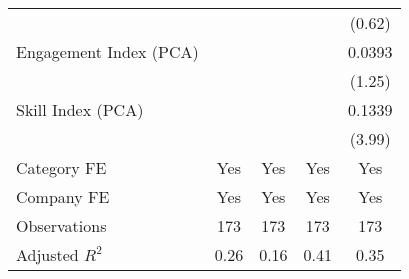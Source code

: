 {\begin{tabular}{l*{4}{c}}
                                   &                   &                   &                   &    (0.62)         \\
[1em]
Engagement Index (PCA)             &                   &                   &                   &    0.0393         \\
                                   &                   &                   &                   &    (1.25)         \\
[1em]
Skill Index (PCA)                  &                   &                   &                   &    0.1339\sym{***}\\
                                   &                   &                   &                   &    (3.99)         \\
[1em]
Category FE                        &       Yes         &       Yes         &       Yes         &       Yes         \\
[1em]
Company FE                         &       Yes         &       Yes         &       Yes         &       Yes         \\
\hline
Observations                       &       173         &       173         &       173         &       173         \\
Adjusted \(R^{2}\)                 &      0.26         &      0.16         &      0.41         &      0.35         \\
\hline\hline
\end{tabular}
}
